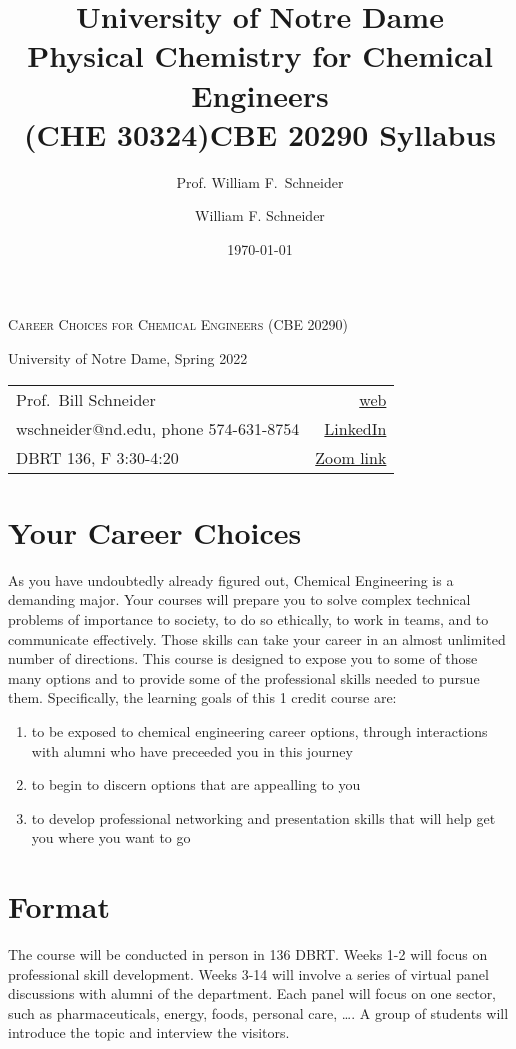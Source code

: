 \documentclass[11pt]{article}
\title{University of Notre Dame\\Physical Chemistry for Chemical Engineers\\(CHE 30324)}
\author{Prof. William F.\ Schneider}
\author{William F. Schneider}
\date{\today}
\title{CBE 20290  Syllabus}
\begin{document}
\begin{OPTIONS}
\end{OPTIONS}

\begin{center}
\textsc{Career Choices for Chemical Engineers (CBE 20290)}

University of Notre Dame, Spring 2022
\end{center}

\begin{center}
\begin{tabular}{lr}
\hline
Prof.~Bill Schneider & \href{https://www.nd.edu/\~wschnei1}{web}\\
wschneider@nd.edu, phone 574-631-8754 & \href{https://www.linkedin.com/in/william-schneider-570091a/}{LinkedIn}\\
DBRT 136, F 3:30-4:20 & \href{https://notredame.zoom.us/meeting/96943641641}{Zoom link}\\
\hline
\end{tabular}
\end{center}

\section{Your Career Choices}
\label{sec:org6ac81c4}
As you have undoubtedly already figured out, Chemical Engineering is a demanding major. Your courses will prepare you to solve complex technical problems of importance to society, to do so ethically, to work in teams, and to communicate effectively.  Those skills can take your career in an almost unlimited number of directions. This course is designed to expose you to some of those many options and to provide some of the professional skills needed to pursue them. Specifically, the learning goals of this 1 credit course are:

\begin{enumerate}
\item to be exposed to chemical engineering career options, through interactions with alumni who have preceeded you in this journey
\item to begin to discern options that are appealling to you
\item to develop  professional networking and presentation skills that will help get you where you want to go
\end{enumerate}

\section{Format}
\label{sec:org4a456f4}
The course will be conducted in person in 136 DBRT.  Weeks 1-2 will focus on professional skill development. Weeks 3-14 will involve a series of virtual panel discussions with alumni of the department. Each panel will focus on one sector, such as pharmaceuticals, energy, foods, personal care, \ldots. A group of students will introduce the topic and interview the visitors. 
\end{document}
